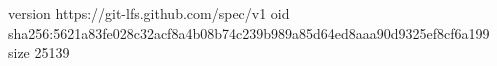 version https://git-lfs.github.com/spec/v1
oid sha256:5621a83fe028c32acf8a4b08b74c239b989a85d64ed8aaa90d9325ef8cf6a199
size 25139
